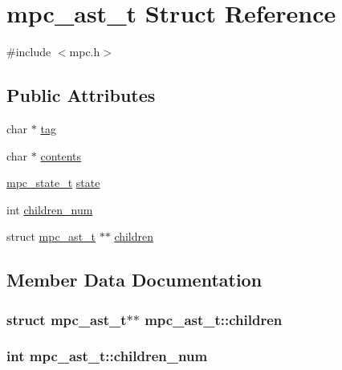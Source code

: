 \hypertarget{structmpc__ast__t}{}\section{mpc\+\_\+ast\+\_\+t Struct Reference}
\label{structmpc__ast__t}


{\ttfamily \#include $<$mpc.\+h$>$}

\subsection*{Public Attributes}
\begin{DoxyCompactItemize}
\item 
char $\ast$ \hyperlink{structmpc__ast__t_a818310eeb75fc5f4750878ac0a5a0f4d}{tag}
\item 
char $\ast$ \hyperlink{structmpc__ast__t_a9a3f82e99e8dd914e114b0f2b9124a84}{contents}
\item 
\hyperlink{structmpc__state__t}{mpc\+\_\+state\+\_\+t} \hyperlink{structmpc__ast__t_ae9912025c4623ef2635af8cf3dbbd882}{state}
\item 
int \hyperlink{structmpc__ast__t_a3bff0c64d76c00acafe7f95f246745ef}{children\+\_\+num}
\item 
struct \hyperlink{structmpc__ast__t}{mpc\+\_\+ast\+\_\+t} $\ast$$\ast$ \hyperlink{structmpc__ast__t_a915fe3572d3999ca85ffd05fa9b51bfb}{children}
\end{DoxyCompactItemize}


\subsection{Member Data Documentation}
\hypertarget{structmpc__ast__t_a915fe3572d3999ca85ffd05fa9b51bfb}{}
\subsubsection[{children}]{\setlength{\rightskip}{0pt plus 5cm}struct {\bf mpc\+\_\+ast\+\_\+t}$\ast$$\ast$ mpc\+\_\+ast\+\_\+t\+::children}\label{structmpc__ast__t_a915fe3572d3999ca85ffd05fa9b51bfb}
\hypertarget{structmpc__ast__t_a3bff0c64d76c00acafe7f95f246745ef}{}
\subsubsection[{children\+\_\+num}]{\setlength{\rightskip}{0pt plus 5cm}int mpc\+\_\+ast\+\_\+t\+::children\+\_\+num}\label{structmpc__ast__t_a3bff0c64d76c00acafe7f95f246745ef}
\hypertarget{structmpc__ast__t_a9a3f82e99e8dd914e114b0f2b9124a84}{}
